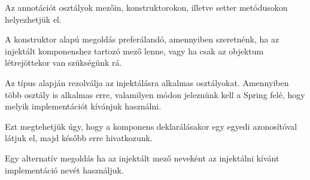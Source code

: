 Az  annotációt osztályok mezőin, konstruktorokon, illetve setter metódusokon helyezhetjük el.


A konstruktor alapú megoldás preferálandó, amennyiben szeretnénk, ha az injektált komponenshez tartozó mező  lenne, vagy ha csak az objektum létrejöttekor van szükségünk rá. \par

Az  típus alapján rezolválja az injektálásra alkalmas osztályokat. Amennyiben több osztály is alkalmas erre, valamilyen módon jeleznünk kell a Spring felé, hogy melyik implementációt kívánjuk használni. \par

Ezt megtehetjük úgy, hogy a komponens deklarálásakor egy egyedi azonosítóval látjuk el, majd később erre hivatkozunk.


Egy alternatív megoldás ha az injektált mező neveként az injektálni kívánt implementáció nevét használjuk.


